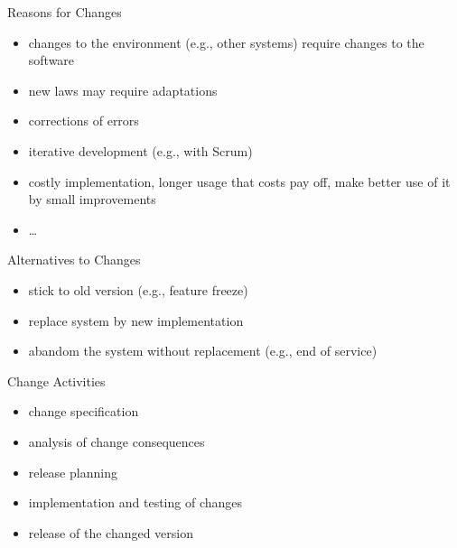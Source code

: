 \begin{frame}{\insertsubsection}
	\begin{fancycolumns}
		\begin{definition}{Reasons for Changes \mysource{\sommerville}}
			\begin{itemize}
				\item changes to the environment (e.g., other systems) require changes to the software
				\item new laws may require adaptations
				\item corrections of errors
				\item iterative development (e.g., with Scrum)
				\item costly implementation, longer usage that costs pay off, make better use of it by small improvements
				\item \ldots
			\end{itemize}
		\end{definition}
		\begin{note}{Alternatives to Changes}
			\begin{itemize}
				\item stick to old version (e.g., feature freeze)
				\item replace system by new implementation
				\item abandom the system without replacement (e.g., end of service)
			\end{itemize}
		\end{note}
	\nextcolumn
		\begin{definition}{Change Activities \mysource{\sommerville}}
			\begin{itemize}
				\item change specification
				\item analysis of change consequences
				\item release planning
				\item implementation and testing of changes
				\item release of the changed version
			\end{itemize}
		\end{definition}
	\end{fancycolumns}
\end{frame}


